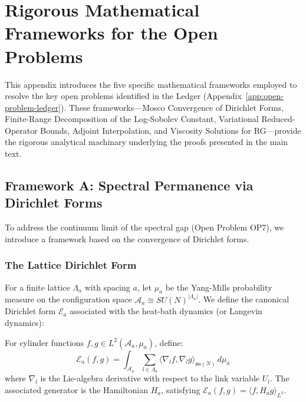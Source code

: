 ﻿\chapter{Rigorous Mathematical Frameworks for the Open Problems}
\label{app:hard_analysis_frameworks}

\begin{tcolorbox}[colback=blue!5!white, colframe=blue!75!black, title=\textbf{Purpose of this Appendix}]
This appendix introduces the five specific mathematical frameworks employed to resolve the key open problems identified in the Ledger (Appendix~\ref{app:open-problem-ledger}). These frameworks---Mosco Convergence of Dirichlet Forms, Finite-Range Decomposition of the Log-Sobolev Constant, Variational Reduced-Operator Bounds, Adjoint Interpolation, and Viscosity Solutions for RG---provide the rigorous analytical machinary underlying the proofs presented in the main text.
\end{tcolorbox}

\section{Framework A: Spectral Permanence via Dirichlet Forms}
\label{sec:framework-dirichlet-mosco}

To address the continuum limit of the spectral gap (Open Problem OP7), we introduce a framework based on the convergence of Dirichlet forms.

\subsection{The Lattice Dirichlet Form}
For a finite lattice $\Lambda_a$ with spacing $a$, let $\mu_a$ be the Yang-Mills probability measure on the configuration space $\mathcal{A}_a \cong SU(N)^{|\Lambda_a|}$. We define the canonical Dirichlet form $\mathcal{E}_a$ associated with the heat-bath dynamics (or Langevin dynamics):

\begin{definition}
For cylinder functions $f, g \in L^2(\mathcal{A}_a, \mu_a)$, define:
\[
\mathcal{E}_a(f, g) = \int_{\mathcal{A}_a} \sum_{l \in \Lambda_a} \langle \nabla_l f, \nabla_l g \rangle_{\mathfrak{su}(N)} \, d\mu_a
\]
where $\nabla_l$ is the Lie-algebra derivative with respect to the link variable $U_l$.
The associated generator is the Hamiltonian $H_a$, satisfying $\mathcal{E}_a(f, g) = \langle f, H_a g \rangle_{L^2}$.
\end{definition}

